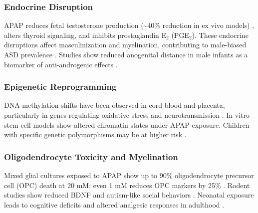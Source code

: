 \documentclass[12pt]{article}
\begin{document}
\subsubsection{Endocrine Disruption}
APAP reduces fetal testosterone production (\textasciitilde40\% reduction in ex vivo models) \citep{kristensen2016}, alters thyroid signaling, and inhibits prostaglandin E$_2$ (PGE$_2$). These endocrine disruptions affect masculinization and myelination, contributing to male-biased ASD prevalence \citep{bauer2021}. Studies show reduced anogenital distance in male infants as a biomarker of anti-androgenic effects \citep{liew2016}.

\subsubsection{Epigenetic Reprogramming}
DNA methylation shifts have been observed in cord blood and placenta, particularly in genes regulating oxidative stress and neurotransmission \citep{zhu2021}. In vitro stem cell models show altered chromatin states under APAP exposure. Children with specific genetic polymorphisms may be at higher risk \citep{schultz2008,bittker2018}.

\subsubsection{Oligodendrocyte Toxicity and Myelination}
Mixed glial cultures exposed to APAP show up to 90\% oligodendrocyte precursor cell (OPC) death at 20 mM; even 1 mM reduces OPC markers by 25\% \citep{perez2012}. Rodent studies show reduced BDNF and autism-like social behaviors \citep{blecharz2018}. Neonatal exposure leads to cognitive deficits and altered analgesic responses in adulthood \citep{viberg2014}.

\end{document}
